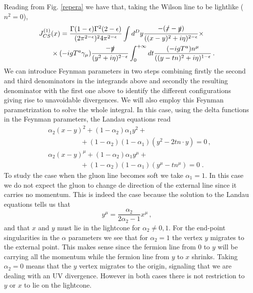 \documentclass[%
 reprint,
 amsmath,amssymb,
 aps,
]{revtex4-1}
\begin{document}
Reading from Fig. \ref{repera} we have that, taking the Wilson line to be lightlike ($n^2=0$),
\begin{align}
J^{(1)}_{CS}&(x)=\frac{\Gamma(1-\epsilon)\Gamma^2(2-\epsilon)}{(2\pi^{2-\epsilon})^24\pi^{2-\epsilon}}\int d^D y \frac{-(\slashed{x}-\slashed{y})}{((x-y)^2+i\eta)^{2-\epsilon}}\times\nonumber\\&\times(-ig T^a\gamma_\mu)\frac{-\slashed{y}}{(y^2+i\eta)^{2-\epsilon}}\int_0^{+\infty}dt \frac{(-igT^a)n^\mu}{((y-tn)^2+i\eta)^{1-\epsilon}}\,.\label{tonaser}
\end{align}
We can introduce Feynman parameters in two steps combining firstly the second and third denominators in the integrands above and secondly the resulting denominator with the first one above to identify the different configurations giving rise to unavoidable divergences. We will also employ this Feynman parametrization to solve the whole integral. In this case, using the delta functions in the Feynman parameters, the Landau equations read 
\begin{align}
&\alpha_2(x-y)^2+(1-\alpha_2)\alpha_1 y^2+\nonumber\;\;\;\;\;\;\;\;\;\;\;\;\\
&\;\;\;\;\;\;\;\;\;\;\;\;\;\;\;\;\; +(1-\alpha_2)(1-\alpha_1)(y^2-2tn\cdot y)=0\,,\\
&\alpha_2(x-y)^\mu+(1-\alpha_2)\alpha_1 y^\mu+\nonumber\;\;\;\;\;\;\;\;\;\;\\
& \;\;\;\;\;\;\;\;\;\;\;\;\;\;\;\;\;+(1-\alpha_2)(1-\alpha_1)(y^\mu-tn^\mu)=0\;.
\end{align}
To study the case when the gluon line becomes soft we take $\alpha_1=1$. In this case we do not expect the gluon to change de direction of the external line since it carries no momentum. This is indeed the case because the solution to the Landau equations tells us that 
\begin{equation}
y^\mu=\frac{\alpha_2}{2\alpha_2-1} x^\mu\,,\label{lanroneador}
\end{equation}
and that $x$ and $y$ must lie in the lightcone for $\alpha_2\neq 0,1$.
For the end-point singularities in the $\alpha$ parameters we see that for $\alpha_2=1$ the vertex $y$ migrates to the external point. This makes sense since the fermion line from $0$ to $y$ will be carrying all the momentum while the fermion line from $y$ to $x$ shrinks. Taking $\alpha_2=0$ means that the $y$ vertex migrates to the origin, signaling that we are dealing with an UV divergence. However in both cases there is not restriction to $y$ or $x$ to lie on the lightcone.
\par
\end{document}
